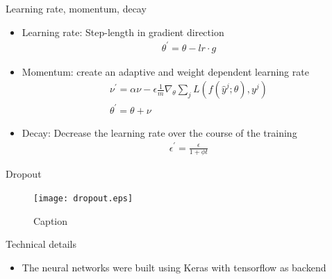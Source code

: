 \begin{frame}{Learning rate, momentum, decay}
\begin{itemize}
    \item Learning rate: Step-length in gradient direction
    \begin{align}
    \theta^{\prime} = \theta - lr \cdot g
    \end{align}
    \item Momentum: create an adaptive and weight dependent learning rate
    \begin{align}
    \nu^{\prime} = \alpha \nu - \epsilon \frac{1}{m} \nabla_{\theta} \sum_j L(f(\hat{y}^j; \theta), y^j)\\
    \theta^{\prime} = \theta + \nu
    \end{align}
    \item Decay: Decrease the learning rate over the course of the training
    \begin{align}
    \epsilon^{\prime} = \frac{\epsilon}{1 + \phi t}
    \end{align}
\end{itemize}
\end{frame}


\begin{frame}{Dropout}
\begin{figure}
    \centering
    \texttt{[image: dropout.eps]}
    \caption{Caption}
    \label{fig:my_label}
\end{figure}
\end{frame}

\begin{frame}{Technical details}
    \begin{itemize}
        \item The neural networks were built using Keras \cite{chollet2015keras} with tensorflow \cite{tensorflow2015-whitepaper} as backend
    \end{itemize}
\end{frame}